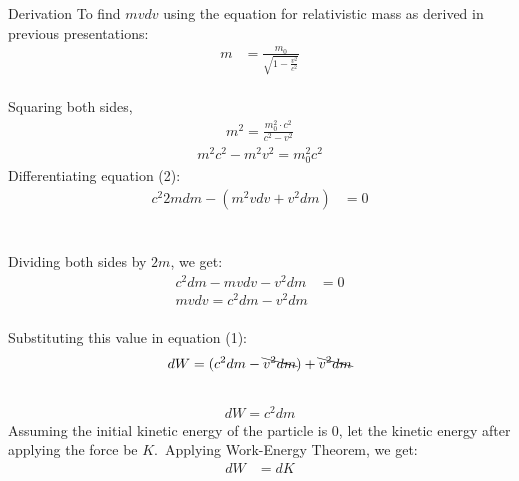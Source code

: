 \documentclass[11pt]{beamer}
\begin{document}
\begin{frame}[t,allowframebreaks]{Derivation}
        To find $mvdv$ using the equation for relativistic mass as derived in previous presentations:\vspace*{-10pt}
        \begin{align*}
            m &= \frac{m_0}{\sqrt{1 - \frac{v^2}{c^2}}}
        \end{align*}~\\\vspace*{-10pt}
        Squaring both sides,\vspace*{-10pt}
        \begin{align*}
            m^2 = \frac{m_0^2 \cdot c^2}{c^2 - v^2}
        \end{align*}\vspace*{-20pt}
        \begin{align}
            \boxed{m^2 c^2 - m^2 v^2 = m_0^2 c^2}
        \end{align}
        Differentiating equation (2):
        \begin{align*}
            c^2 2mdm - (m^2 vdv + v^2 dm) &= 0\\
        \end{align*}~\\\vspace*{-40pt}
        \begin{flushright}\end{flushright}

        \framebreak

        Dividing both sides by $2m$, we get:
        \begin{align*}
            c^2 dm - mvdv - v^2 dm &= 0\\
            \boxed{mvdv = c^2 dm - v^2 dm}
        \end{align*}~\\[-15pt]
        Substituting this value in equation (1):
        \begin{align*}
            dW &= (c^2 dm - \bcancel{v^2 dm}) + \bcancel{v^2 dm}\\
        \end{align*}~\\[-50pt]
        \begin{align}
            \boxed{dW = c^2 dm}
        \end{align}
        Assuming the initial kinetic energy of the particle is 0, let the kinetic energy after applying the force be
        $K$.\ Applying Work-Energy Theorem, we get:
        \begin{align*}
            dW &= dK\\
        \end{align*}


\end{frame}
\end{document}
